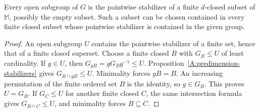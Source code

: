 \begin{corollary}
\label{A:predimension-open-subgroups}
Every open subgroup of $G$ is the pointwise stabilizer of a finite
$d$-closed subset of $\mathbb M$, possibly the empty subset.
Such a subset can be chosen contained in every finite closed
subset whose pointwise stabilizer is contained in the given group.
\end{corollary}
\begin{proof}
An open subgroup $U$ contains the pointwise stabilizer of a finite
set, hence that of a finite closed superset. Choose a finite closed
$B$ with $G_B\leq U$ of least cardinality. If $g\in U$, then
$G_{gB}=gG_Bg^{-1}\leq U$. Proposition~\ref{A:predimension-stabilizers}
gives $G_{B\cap gB}\leq U$. Minimality forces $gB=B$.
An increasing permutation of the finite ordered set $B$ is the
identity, so $g\in G_B$. This proves $U=G_B$.
If $G_C\leq U$ for another finite closed $C$, the same intersection
formula gives $G_{B\cap C}\leq U$, and minimality forces
$B\subseteq C$.
\end{proof}
